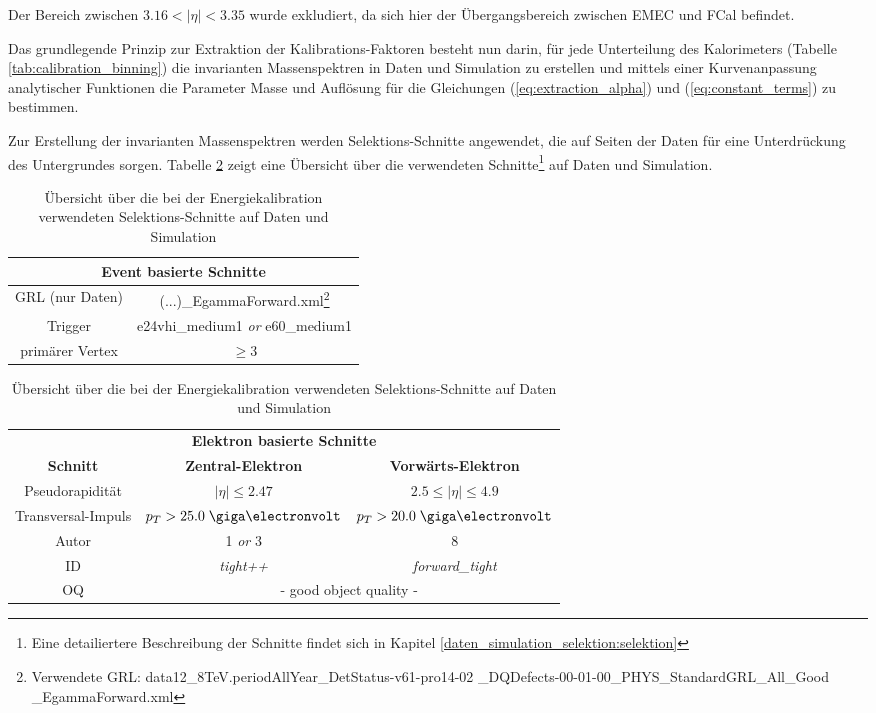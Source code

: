Der Bereich zwischen $3.16 < |\eta| < 3.35$ wurde exkludiert, da sich
hier der Übergangsbereich zwischen \acs{EMEC} und \acs{FCal} befindet.

Das grundlegende Prinzip zur Extraktion der Kalibrations-Faktoren besteht nun
darin, für jede Unterteilung des Kalorimeters (Tabelle
\ref{tab:calibration_binning}) die invarianten Massenspektren in Daten und
Simulation zu erstellen und mittels einer Kurvenanpassung analytischer
Funktionen die Parameter Masse und Auflösung für die Gleichungen
(\ref{eq:extraction_alpha}) und (\ref{eq:constant_terms}) zu bestimmen.

Zur Erstellung der invarianten Massenspektren werden Selektions-Schnitte
angewendet, die auf Seiten der Daten für eine Unterdrückung des Untergrundes
sorgen. Tabelle \ref{tab:calibration_cuts} zeigt eine Übersicht über die
verwendeten Schnitte\footnote{Eine detailiertere Beschreibung der Schnitte
findet sich in Kapitel \ref{daten_simulation_selektion:selektion}} auf Daten
und Simulation.

\begin{savenotes}
\begin{table}[h]
    \centering
    \begin{tabular}{|c|c|}
        \hline
        \multicolumn{2}{|c|}{\textbf{Event basierte Schnitte}} \\
        \hline\hline
        \acs{GRL} (nur Daten) & (...)\_EgammaForward.xml\footnote{Verwendete
            \ac{GRL}:
            data12\_8TeV.periodAllYear\_DetStatus-v61-pro14-02
            \_DQDefects-00-01-00\_PHYS\_StandardGRL\_All\_Good
            \_EgammaForward.xml} \\
        \hline
        Trigger & e24vhi\_medium1 \textit{or} e60\_medium1 \\
        \hline
        primärer Vertex & $\geq 3$ \\
        \hline
    \end{tabular}
    \vspace{15pt}

    \begin{tabular}{|c|c|c|}
        \hline
        \multicolumn{3}{|c|}{\textbf{Elektron basierte Schnitte}} \\
        \textbf{Schnitt}&\textbf{Zentral-Elektron}&\textbf{Vorwärts-Elektron}\\
        \hline \hline
        Pseudorapidität & $|\eta| \leq 2.47$ & $2.5 \leq |\eta| \leq 4.9$ \\
        \hline
        Transversal-Impuls & $p_T > 25.0 \GeV$ & $p_T > 20.0 \GeV$ \\
        \hline
        Autor & 1 \textit{or} 3 & 8 \\
        \hline
        ID & \textit{tight++} & \textit{forward\_tight} \\
        \hline
        OQ & \multicolumn{2}{|c|}{- good object quality -} \\
        \hline
    \end{tabular}
    \caption{Übersicht über die bei der Energiekalibration verwendeten
        Selektions-Schnitte auf Daten und Simulation}
    \label{tab:calibration_cuts}
\end{table}
\end{savenotes}

